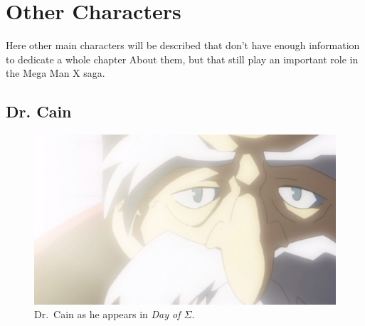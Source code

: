 \chapter{Other Characters}
Here other main characters will be described that don't have enough information to dedicate a whole chapter
About them, but that still play an important role in the Mega Man X saga.

\section{Dr. Cain} \label{char:Cain}

\begin{figure}[h]
	\centering
	\includegraphics[width=0.5\linewidth]{figures/Characters/Char_Cain_MHX.jpg}
	\caption{Dr.~Cain as he appears in \emph{Day of $\Sigma$}.}
\end{figure}

